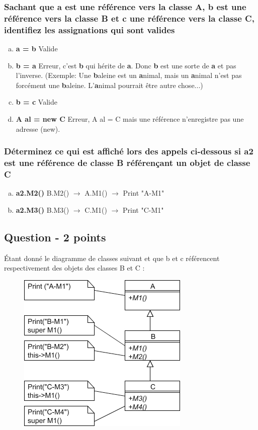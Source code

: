 \subsubsection{Sachant que a est une référence vers la classe A, b est une référence vers la classe B et c une référence vers la classe C, identifiez les assignations qui sont valides}
\begin{enumerate}[a)]
	\item \textbf{a = b} \textcolor[rgb]{0,0.48,0.58}{Valide}
	\item \textbf{b = a} \textcolor[rgb]{0,0.48,0.58}{Erreur, c'est \textbf{b} qui hérite de \textbf{a}. Donc \textbf{b} est une sorte de \textbf{a} et pas l'inverse. (Exemple: Une \textbf{b}aleine est un \textbf{a}nimal, mais un \textbf{a}nimal n'est pas forcément une \textbf{b}aleine. L'\textbf{a}nimal pourrait être autre chose...)}
	\item \textbf{b = c} \textcolor[rgb]{0,0.48,0.58}{Valide}
	\item \textbf{A al = new C} \textcolor[rgb]{0,0.48,0.58}{Erreur, A al = C mais une référence n'enregistre pas une adresse (new).}
\end{enumerate}



\subsubsection{Déterminez ce qui est affiché lors des appels ci-dessous si a2 est une référence de classe B référençant un objet de classe C}
\begin{enumerate}[a)]
	\item \textbf{a2.M2()} \textcolor[rgb]{0,0.48,0.58}{B.M2() $\rightarrow$ A.M1() $\rightarrow$ Print "A-M1"}
	\item \textbf{a2.M3()} \textcolor[rgb]{0,0.48,0.58}{B.M3() $\rightarrow$ C.M1() $\rightarrow$ Print "C-M1"}
\end{enumerate}



\subsection{Question - 2 points}
Étant donné le diagramme de classes suivant et que b et c référencent respectivement des objets des classes B et C :
\begin{figure}[ht]
	\centering
		\includegraphics[height=0.50\textwidth]{2.oop/DiaDeClasse.png}
	\label{fig:DiaDeClasse}
\end{figure}



